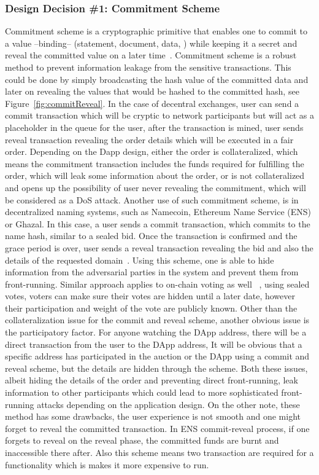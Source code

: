 \subsubsection{Design Decision \#1: Commitment Scheme\newline} \label{CommitmentScheme} %
Commitment scheme is a cryptographic primitive that enables one to commit to a value --binding-- (\eg statement, document, data, \etc) while keeping it a secret and reveal the committed value on a later time~\cite{brassard1988minimum}. Commitment scheme is a robust method to prevent information leakage from the sensitive transactions. This could be done by simply broadcasting the hash value of the committed data and later on revealing the values that would be hashed to the committed hash, see Figure~\ref{fig:commitReveal}. 
In the case of decentral exchanges, user can send a commit transaction which will be cryptic to network participants but will act as a placeholder in the queue for the user, after the transaction is mined, user sends reveal transaction revealing the order details which will be executed in a fair order. Depending on the Dapp design, either the order is collateralized, which means the commitment transaction includes the funds required for fulfilling the order, which will leak some information about the order, or is not collateralized and opens up the possibility of user never revealing the commitment, which will be considered as a DoS attack. 
Another use of such commitment scheme, is in decentralized naming systems, such as Namecoin, Ethereum Name Service (ENS) or Ghazal. In this case, a user sends a commit transaction, which commits to the name hash, similar to a sealed bid. Once the transaction is confirmed and the grace period is over, user sends a reveal transaction revealing the bid and also the details of the requested domain~\cite{kalodner2015empirical}. Using this scheme, one is able to hide information from the adversarial parties in the system and prevent them from front-running. Similar approach applies to on-chain voting as well ~\cite{adChainPLCRVoting}, using sealed votes, voters can make sure their votes are hidden until a later date, however their participation and weight of the vote are publicly known. 
Other than the collateralization issue for the commit and reveal scheme, another obvious issue is the participatory factor. For anyone watching the DApp address, there will be a direct transaction from the user to the DApp address, It will be obvious that a specific address has participated in the auction or the DApp using a commit and reveal scheme, but the details are hidden through the scheme. Both these issues, albeit hiding the details of the order and preventing direct front-running, leak information to other participants which could lead to more sophisticated front-running attacks depending on the application design. On the other note, these method has some drawbacks, the user experience is not smooth and one might forget to reveal the committed transaction. In ENS commit-reveal process, if one forgets to reveal on the reveal phase, the committed funds are burnt and inaccessible there after. Also this scheme means two transaction are required for a functionality which is makes it more expensive to run.

